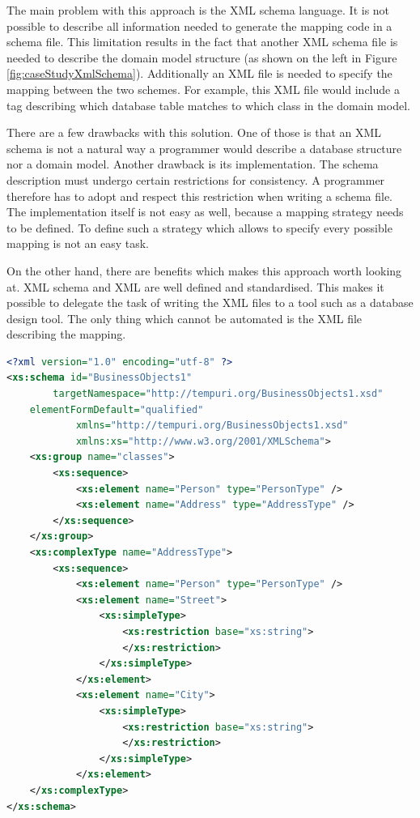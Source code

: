 		The main problem with this approach is the XML schema language. It is not possible
		to describe all information needed to generate the mapping code in a schema file.
		This limitation results in the fact that another XML schema file is needed to describe
		the domain model structure (as shown on the left in Figure \ref{fig:caseStudyXmlSchema}).
		Additionally an XML file is needed to specify the mapping between the two schemes. For
		example, this XML file would include a tag describing which database table
		matches to which class in the domain model.
		
		There are a few drawbacks with this solution. One of those is that an XML schema
		is not a natural way a programmer would describe a database structure nor a 
		domain model. Another drawback is its implementation. The schema description must 
		undergo certain restrictions for consistency. A programmer therefore has to adopt
		and respect this restriction when writing a schema file. The implementation
		itself is not easy as well, because a mapping strategy needs to be defined.
		To define such a strategy which allows to specify every possible mapping is not
		an easy task.
		
		On the other hand, there are benefits which makes this approach worth looking
		at. XML schema and XML are well defined and standardised. This makes it 
		possible to delegate the task of writing the XML files to a tool such as
		a database design tool. The only thing which cannot be automated is the 
		XML file describing the mapping.
	
	\begin{lstlisting}[float,language=XML,caption=XML schema describes database structure,label=lst:xsdDbConfig]
<?xml version="1.0" encoding="utf-8" ?>
<xs:schema id="BusinessObjects1" 
		targetNamespace="http://tempuri.org/BusinessObjects1.xsd"
	elementFormDefault="qualified" 
			xmlns="http://tempuri.org/BusinessObjects1.xsd" 
			xmlns:xs="http://www.w3.org/2001/XMLSchema">
	<xs:group name="classes">
		<xs:sequence>
			<xs:element name="Person" type="PersonType" />
			<xs:element name="Address" type="AddressType" />
		</xs:sequence>
	</xs:group>
	<xs:complexType name="AddressType">
		<xs:sequence>
			<xs:element name="Person" type="PersonType" />
			<xs:element name="Street">
				<xs:simpleType>
					<xs:restriction base="xs:string">
					</xs:restriction>
				</xs:simpleType>
			</xs:element>
			<xs:element name="City">
				<xs:simpleType>
					<xs:restriction base="xs:string">
					</xs:restriction>
				</xs:simpleType>
			</xs:element>
	</xs:complexType>
</xs:schema>
	\end{lstlisting}
		

